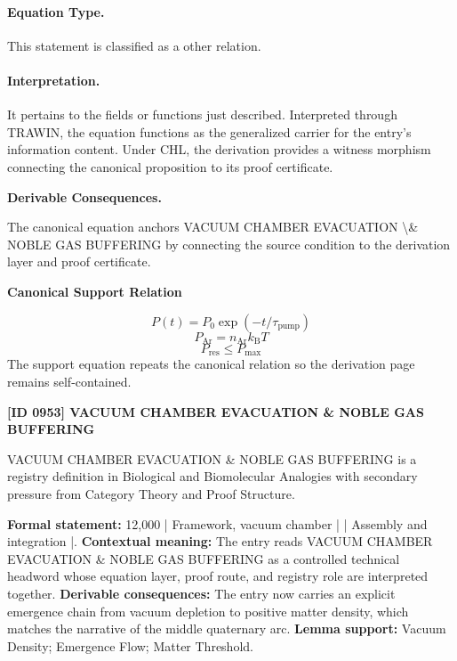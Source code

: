 \paragraph{Equation Type.}
This statement is classified as a other relation.

\paragraph{Interpretation.}
It pertains to the fields or functions just described. Interpreted through TRAWIN, the equation functions as the generalized carrier for the entry’s information content. Under CHL, the derivation provides a witness morphism connecting the canonical proposition to its proof certificate.

\par\vspace{0.35em}
\noindent\textbf{Derivable Consequences.}\quad
\begingroup
\footnotesize
\raggedright
The canonical equation anchors VACUUM CHAMBER EVACUATION \textbackslash{}\& NOBLE GAS BUFFERING by connecting the source condition to the derivation layer and proof certificate.
\par\endgroup

\noindent\textbf{Canonical Support Relation}\par
\[
P(t)=P_0\exp(-t/\tau_{\mathrm{pump}})
\]
\[
P_{\mathrm{Ar}}=n_{\mathrm{Ar}}k_{\mathrm{B}}T
\]
\[
P_{\mathrm{res}}\leq P_{\mathrm{max}}
\]
\noindent The support equation repeats the canonical relation so the derivation page remains self-contained.\par

\clearpage
\noindent\textbf{[ID 0953] VACUUM CHAMBER EVACUATION \& NOBLE GAS BUFFERING}\par
\vspace{0.35em}
\begingroup\small
{}
VACUUM CHAMBER EVACUATION \& NOBLE GAS BUFFERING is a registry definition in Biological and Biomolecular Analogies with secondary pressure from Category Theory and Proof Structure.

\begingroup\footnotesize\setlength{\emergencystretch}{3em}\sloppy
\textbf{Formal statement:} 12,000 | Framework, vacuum chamber | | Assembly and integration |. \textbf{Contextual meaning:} The entry reads VACUUM CHAMBER EVACUATION \& NOBLE GAS BUFFERING as a controlled technical headword whose equation layer, proof route, and registry role are interpreted together. \textbf{Derivable consequences:} The entry now carries an explicit emergence chain from vacuum depletion to positive matter density, which matches the narrative of the middle quaternary arc. \textbf{Lemma support:} Vacuum Density; Emergence Flow; Matter Threshold.\par
\endgroup

